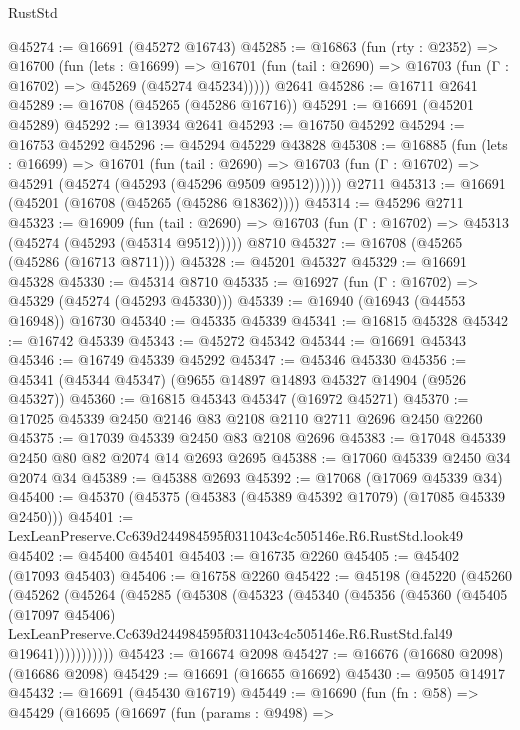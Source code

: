 \begin{lexlean}{RustStd}
\begin{coremodule}
@45274 := @16691 (@45272 @16743)
@45285 := @16863
    (fun (rty : @2352) =>
    @16700
      (fun (lets : @16699) =>
      @16701 (fun (tail : @2690) => @16703 (fun (Γ : @16702) => @45269 (@45274 @45234)))))
    @2641
@45286 := @16711 @2641
@45289 := @16708 (@45265 (@45286 @16716))
@45291 := @16691 (@45201 @45289)
@45292 := @13934 @2641
@45293 := @16750 @45292
@45294 := @16753 @45292
@45296 := @45294 @45229 @43828
@45308 := @16885
    (fun (lets : @16699) =>
    @16701
      (fun (tail : @2690) =>
      @16703 (fun (Γ : @16702) => @45291 (@45274 (@45293 (@45296 @9509 @9512))))))
    @2711
@45313 := @16691 (@45201 (@16708 (@45265 (@45286 @18362))))
@45314 := @45296 @2711
@45323 := @16909
    (fun (tail : @2690) => @16703 (fun (Γ : @16702) => @45313 (@45274 (@45293 (@45314 @9512)))))
    @8710
@45327 := @16708 (@45265 (@45286 (@16713 @8711)))
@45328 := @45201 @45327
@45329 := @16691 @45328
@45330 := @45314 @8710
@45335 := @16927 (fun (Γ : @16702) => @45329 (@45274 (@45293 @45330)))
@45339 := @16940 (@16943 (@44553 @16948)) @16730
@45340 := @45335 @45339
@45341 := @16815 @45328
@45342 := @16742 @45339
@45343 := @45272 @45342
@45344 := @16691 @45343
@45346 := @16749 @45339 @45292
@45347 := @45346 @45330
@45356 := @45341 (@45344 @45347) (@9655 @14897 @14893 @45327 @14904 (@9526 @45327))
@45360 := @16815 @45343 @45347 (@16972 @45271)
@45370 := @17025 @45339 @2450 @2146 @83 @2108 @2110 @2711 @2696 @2450 @2260
@45375 := @17039 @45339 @2450 @83 @2108 @2696
@45383 := @17048 @45339 @2450 @80 @82 @2074 @14 @2693 @2695
@45388 := @17060 @45339 @2450 @34 @2074 @34
@45389 := @45388 @2693
@45392 := @17068 (@17069 @45339 @34)
@45400 := @45370 (@45375 (@45383 (@45389 @45392 @17079) (@17085 @45339 @2450)))
@45401 := LexLeanPreserve.Cc639d244984595f0311043c4c505146e.R6.RustStd.look49
@45402 := @45400 @45401
@45403 := @16735 @2260
@45405 := @45402 (@17093 @45403)
@45406 := @16758 @2260
@45422 := @45198
    (@45220
      (@45260
        (@45262
          (@45264
            (@45285
              (@45308
                (@45323
                  (@45340
                    (@45356
                      (@45360
                        (@45405
                          (@17097 @45406)
                          LexLeanPreserve.Cc639d244984595f0311043c4c505146e.R6.RustStd.fal49
                          @19641)))))))))))
@45423 := @16674 @2098
@45427 := @16676 (@16680 @2098) (@16686 @2098)
@45429 := @16691 (@16655 @16692)
@45430 := @9505 @14917
@45432 := @16691 (@45430 @16719)
@45449 := @16690
    (fun (fn : @58) =>
    @45429
      (@16695
        (@16697
          (fun (params : @9498) =>

\end{coremodule}
\end{lexlean}
